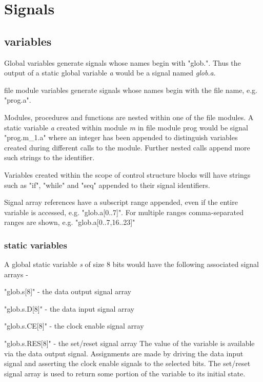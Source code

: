     \section{Signals}
    
        \subsection{variables}

            Global variables generate signals whose names begin with "glob.". Thus
            the output of a static global variable {\em a} would be a signal named
            {\em glob.a}.
            
            file module variables generate signals whose names begin with the
            file name, e.g. "prog.a".
            
            Modules, procedures and functions are nested within one of the file
            modules. A static variable {\em a} created within module {\em m}
            in file module prog
            would be signal "prog.m\_1.a" where an integer has been
            appended to distinguish variables created during different calls
            to the module. Further nested calls append more such strings
            to the identifier.
            
            Variables created within the scope of control structure blocks
            will have strings such as "if", "while" and "seq" appended to
            their signal identifiers.
            
            Signal array references have a subscript range appended, even
            if the entire variable is accessed, e.g. "glob.a[0..7]". For
            multiple ranges comma-separated ranges are shown, e.g.
            "glob.a[0..7,16..23]"

            \subsubsection{static variables}
            
                A global static variable {\em s} of size 8 bits would have
                the following associated signal arrays -
                \blist
                \item   "glob.s[8]" - the data output signal array
                \item   "glob.s.D[8]" - the data input signal array
                \item   "glob.s.CE[8]" - the clock enable signal array
                \item   "glob.s.RES[8]" - the set/reset signal array
                \blend                
                The value of the variable is available via the data output
                signal. Assignments are made by driving the data input
                signal and asserting the clock enable signals to the selected
                bits. The set/reset signal array is used to return some
                portion of the variable to its initial state.


